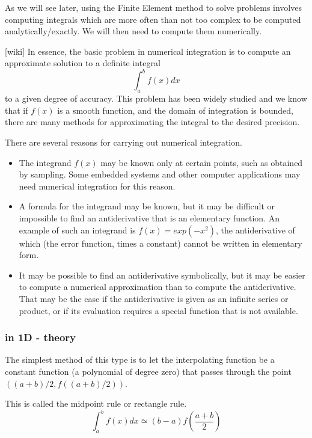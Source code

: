 As we will see later, using the Finite Element method to solve problems involves computing integrals which are more often than not too complex to be computed analytically/exactly. We will then need to compute them numerically.

[wiki] In essence, 
the basic problem in numerical integration is to compute an approximate solution to a definite integral
\[
\int_a^b f(x) dx
\]
to a given degree of accuracy.
This problem has been widely studied and we know that 
if $f(x)$ is a smooth function, and the domain of integration is bounded, there are many methods for approximating the integral to the desired precision.

There are several reasons for carrying out numerical integration.
\begin{itemize}
\item The integrand $f(x)$ may be known only at certain points, such as obtained by sampling. Some embedded systems and other computer applications may need numerical integration for this reason.
\item A formula for the integrand may be known, but it may be difficult or impossible to find an antiderivative that is an elementary function. An example of such an integrand is $f(x)=exp(-x^2)$, the antiderivative of which (the error function, times a constant) cannot be written in elementary form.
\item It may be possible to find an antiderivative symbolically, but it may be easier to compute a numerical approximation than to compute the antiderivative. That may be the case if the antiderivative is given as an infinite series or product, or if its evaluation requires a special function that is not available.
\end{itemize}

\subsubsection{in 1D - theory \label{sec:quad1D}}

The simplest method of this type is to let the interpolating function be a constant function (a polynomial of degree zero) that passes through the point $((a+b)/2, f((a+b)/2))$.

This is called the midpoint rule  or rectangle rule. 
\[
\int_a^b f(x)dx \simeq (b-a) f(\frac{a+b}{2})
\]


